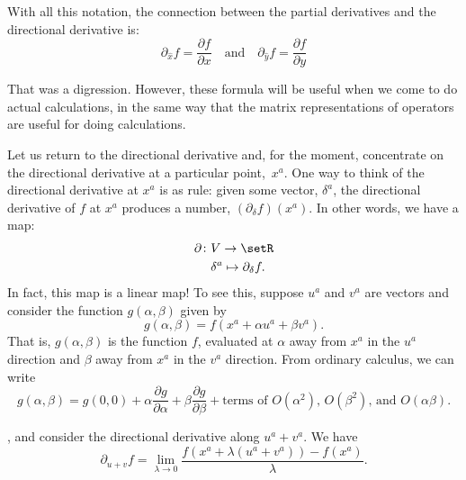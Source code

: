 \documentclass[10pt, a4paper]{article}
\begin{document}
With all this notation, the connection between the partial derivatives
and the directional derivative is:
\begin{equation*}
  \partial_{\hat{x}}f = \frac{\partial f}{\partial x} \quad\text{and}\quad 
  \partial_{\hat{y}}f = \frac{\partial f}{\partial y} 
\end{equation*}

That was a digression. However, these formula will be useful when we
come to do actual calculations, in the same way that the matrix
representations of operators are useful for doing calculations.

Let us return to the directional derivative and, for the moment,
concentrate on the directional derivative at a particular
point,~$x^a$. One way to think of the directional derivative at $x^a$
is as rule: given some vector, $\delta^a$, the directional derivative of
$f$ at $x^a$ produces a number, $(\partial_\delta f)(x^a)$. In other words, we
have a map:
\begin{align*}
  \partial \colon & V \to \setR \\
           & \delta^a \mapsto \partial_\delta f.
\end{align*}
In fact, this map is a linear map! To see this, suppose $u^a$ and
$v^a$ are vectors and consider the function $g(\alpha,\beta)$ given by
\begin{equation*}
  g(\alpha,\beta) = f(x^a + \alpha u^a + \beta v^a).
\end{equation*}
That is, $g(\alpha,\beta)$ is the function $f$, evaluated at $\alpha$ away from $x^a$
in the $u^a$ direction and $\beta$ away from $x^a$ in the $v^a$
direction. From ordinary calculus, we can write
\begin{equation*}
  g(\alpha,\beta) = g(0,0) + \alpha\frac{\partial g}{\partial \alpha} + \beta\frac{\partial g}{\partial \beta} +
  \text{terms of $O(\alpha^2)$, $O(\beta^2)$, and $O(\alpha\beta)$}.
\end{equation*}




, and consider the directional derivative along
$u^a+v^a$. We have
\begin{equation*}
\partial_{u+v}f = \lim_{\lambda\to 0}\frac{f(x^a + \lambda(u^a+v^a)) - f(x^a)}{\lambda}. 
\end{equation*}
\end{document}
